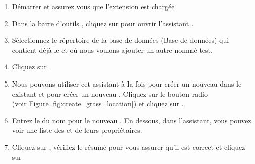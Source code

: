 \begin{enumerate}
  \item Démarrer \qg et assurez vous que l'extension \grass est chargée
  \item Dans la barre d'outils \grass, cliquez sur  pour ouvrir l'assistant .
  \item Sélectionnez le répertoire  de la base de données \grass (Base de données) qui contient déjà le  et où nous voulons ajouter un autre  nommé test.
  \item Cliquez sur . 
  \item Nous pouvons utiliser cet assistant à la fois pour créer un nouveau  dans le  existant et pour créer un nouveau . Cliquez sur le bouton radio\\  (voir Figure \ref{fig:create_grass_location}) et cliquez sur .
  \item Entrez le  du nom pour le nouveau . En dessous, dans l'assistant, vous pouvez voir une liste des  et de leurs propriétaires.
  \item Cliquez sur , vérifiez le résumé pour vous assurer qu'il est correct et cliquez sur 
\end{enumerate}

